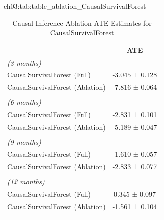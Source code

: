 \begin{table}[hbtp]
    \setlength{\tabcolsep}{4pt}
    \footnotesize
    \ChThreeFloatContents
      {ch03:tab:table_ablation_CausalSurvivalForest}
      {\caption{Causal Inference Ablation ATE Estimates for CausalSurvivalForest}}
      {\begin{tabular}{l c }
    \toprule
    &ATE \\
    \midrule
    \textit{(3 months)}
 \\
    CausalSurvivalForest (Full) & -3.045 ± 0.128 \\
    CausalSurvivalForest (Ablation) & -7.816 ± 0.064 \\\\
    \textit{(6 months)}
 \\
    CausalSurvivalForest (Full) & -2.831 ± 0.101 \\
    CausalSurvivalForest (Ablation) & -5.189 ± 0.047 \\\\
    \textit{(9 months)}
 \\
    CausalSurvivalForest (Full) & -1.610 ± 0.057 \\
    CausalSurvivalForest (Ablation) & -2.833 ± 0.077 \\\\
    \textit{(12 months)}
 \\
    CausalSurvivalForest (Full) & 0.345 ± 0.097 \\
    CausalSurvivalForest (Ablation) & -1.561 ± 0.104 \\\\
    \bottomrule
    \end{tabular}}
\end{table}